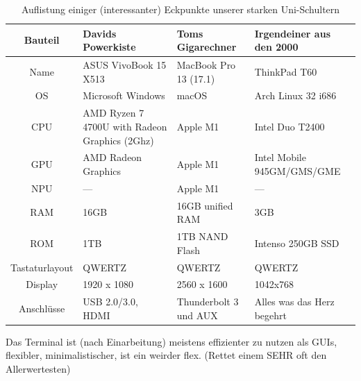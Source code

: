 \documentclass{scrartcl}
\begin{document}
    \subaufgabe
        \begin{table}[H]
            \centering
            \begin{tabular}{c|p{3cm}|p{3cm}|p{3cm}}
                Bauteil & Davids Powerkiste & Toms Gigarechner & Irgendeiner aus den 2000  \\
                \hline
                Name & ASUS VivoBook 15 X513  & MacBook Pro 13 (17.1) & ThinkPad T60 \\
                \hline
                OS & Microsoft Windows & macOS & Arch Linux 32 i686 \\
                CPU & AMD Ryzen 7 4700U with Radeon Graphics (2Ghz) & Apple M1 & Intel Duo T2400\\
                GPU & AMD Radeon Graphics & Apple M1 & Intel Mobile 945GM/GMS/GME \\
                NPU & --- & Apple M1 & --- \\
                RAM & 16GB & 16GB unified RAM & 3GB  \\
                ROM & 1TB & 1TB NAND Flash & Intenso 250GB SSD \\
                \hline
                Tastaturlayout & QWERTZ & QWERTZ & QWERTZ \\
                Display & 1920 x 1080 & 2560 x 1600 & 1042x768 \\
                Anschlüsse & USB 2.0/3.0, HDMI & Thunderbolt 3 und AUX & Alles was das Herz begehrt\\
            \end{tabular}
            \caption{Auflistung einiger (interessanter) Eckpunkte unserer starken Uni-Schultern}
            \label{tab:my_label}
        \end{table}

    \subaufgabe
        Das Terminal ist (nach Einarbeitung) meistens effizienter zu nutzen als GUIs, flexibler, minimalistischer, ist ein weirder flex. (Rettet einem SEHR oft den Allerwertesten)
\end{document}
